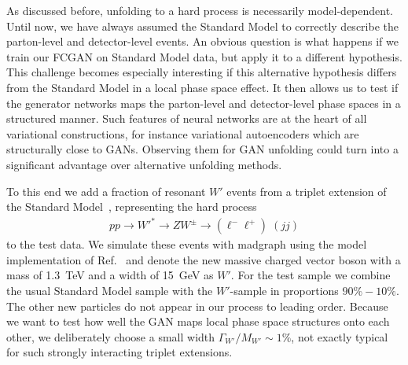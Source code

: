 As discussed before, unfolding to a hard process is necessarily
model-dependent. Until now, we have always assumed the Standard Model
to correctly describe the parton-level and detector-level events. An
obvious question is what happens if we train our FCGAN on Standard
Model data, but apply it to a different hypothesis. This challenge
becomes especially interesting if this alternative hypothesis differs
from the Standard Model in a local phase space effect. It then allows
us to test if the generator networks maps the parton-level and
detector-level phase spaces in a structured manner. Such features of
neural networks are at the heart of all variational constructions, for
instance variational autoencoders which are structurally close to
GANs. Observing them for GAN unfolding could turn into a significant
advantage over alternative unfolding methods.

To this end we add a fraction of resonant $W'$ events from a
triplet extension of the Standard Model~\cite{Biekoetter:2014jwa},
representing the hard process
%
\begin{align}
p p
\to {W'}^*
\to Z W^\pm
\to (\ell^- \ell^+) \; (j j )
\end{align}
%
to the test data.  We simulate these events with madgraph using the
model implementation of Ref.~\cite{Brehmer:2015rna} and denote the new
massive charged vector boson with a mass of 1.3~TeV and a width of
15~GeV as $W'$. For the test sample we combine the usual Standard
Model sample with the $W'$-sample in proportions $90\% - 10\%$.  The
other new particles do not appear in our process to leading order.
Because we want to test how well the GAN maps local phase space
structures onto each other, we deliberately choose a small width
$\Gamma_{W'}/M_{W'}\sim 1\%$, not exactly typical for such strongly
interacting triplet extensions.


